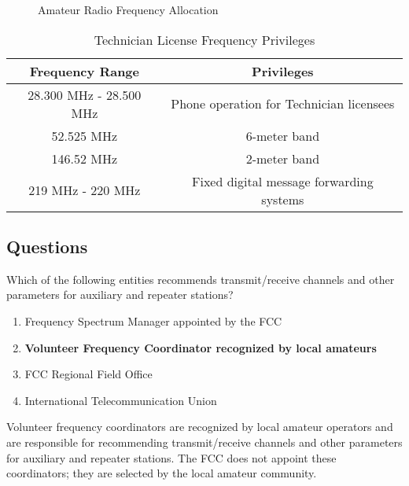 \begin{figure}[h]
    \centering
    \caption{Amateur Radio Frequency Allocation}
    \label{fig:frequency_allocation}
\end{figure}

\begin{table}[h]
    \centering
    \begin{tabular}{|c|c|}
        \hline
        \textbf{Frequency Range} & \textbf{Privileges} \\
        \hline
        28.300 MHz - 28.500 MHz & Phone operation for Technician licensees \\
        52.525 MHz & 6-meter band \\
        146.52 MHz & 2-meter band \\
        219 MHz - 220 MHz & Fixed digital message forwarding systems \\
        \hline
    \end{tabular}
    \caption{Technician License Frequency Privileges}
    \label{tab:technician_frequencies}
\end{table}

\subsection*{Questions}
\begin{tcolorbox}[colback=gray!10!white,colframe=black!75!black,title={T1A08}]
    Which of the following entities recommends transmit/receive channels and other parameters for auxiliary and repeater stations?
    \begin{enumerate}[label=\Alph*,noitemsep]
        \item Frequency Spectrum Manager appointed by the FCC
        \item \textbf{Volunteer Frequency Coordinator recognized by local amateurs}
        \item FCC Regional Field Office
        \item International Telecommunication Union
    \end{enumerate}
\end{tcolorbox}
Volunteer frequency coordinators are recognized by local amateur operators and are responsible for recommending transmit/receive channels and other parameters for auxiliary and repeater stations. The FCC does not appoint these coordinators; they are selected by the local amateur community.

